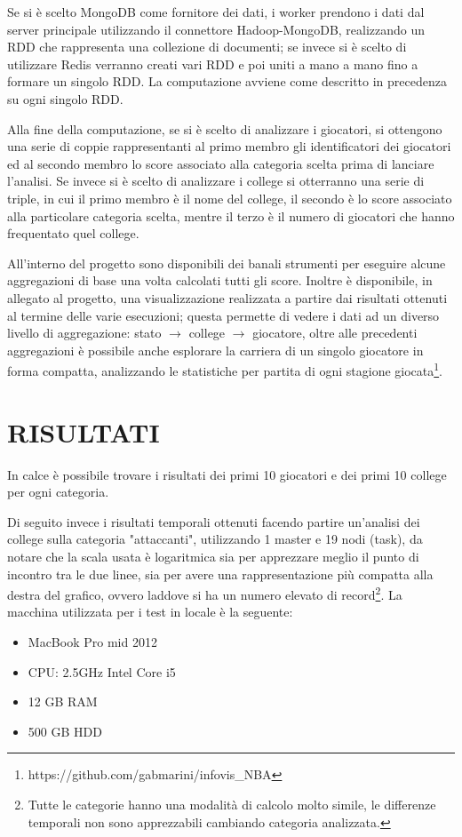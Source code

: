 \documentclass[10pt,a4paper,twocolumn]{article}
\begin{document}
Se si è scelto MongoDB come fornitore dei dati, i worker prendono i dati dal server principale utilizzando il connettore Hadoop-MongoDB, realizzando un RDD che rappresenta una collezione di documenti; se invece si è scelto di utilizzare Redis verranno creati vari RDD e poi uniti a mano a mano fino a formare un singolo RDD. La computazione avviene come descritto in precedenza su ogni singolo RDD.

Alla fine della computazione, se si è scelto di analizzare i giocatori, si ottengono una serie di coppie rappresentanti al primo membro gli identificatori dei giocatori ed al secondo membro lo score associato alla categoria scelta prima di lanciare l'analisi. Se invece si è scelto di analizzare i college si otterranno una serie di triple, in cui il primo membro è il nome del college, il secondo è lo score associato alla particolare categoria scelta, mentre il terzo è il numero di giocatori che hanno frequentato quel college.

All'interno del progetto sono disponibili dei banali strumenti per eseguire alcune aggregazioni di base una volta calcolati tutti gli score. Inoltre è disponibile, in allegato al progetto, una visualizzazione realizzata a partire dai risultati ottenuti al termine delle varie esecuzioni; questa permette di vedere i dati ad un diverso livello di aggregazione: stato $\rightarrow$ college $\rightarrow$ giocatore, oltre alle precedenti aggregazioni è possibile anche esplorare la carriera di un singolo giocatore in forma compatta, analizzando le statistiche per partita di ogni stagione giocata\footnote{https://github.com/gabmarini/infovis\_NBA}.

\section{RISULTATI}

In calce è possibile trovare i risultati dei primi 10 giocatori e dei primi 10 college per ogni categoria.

Di seguito invece i risultati temporali ottenuti facendo partire un'analisi dei college sulla categoria "attaccanti", utilizzando 1 master e 19 nodi (task), da notare che la scala usata è logaritmica sia per apprezzare meglio il punto di incontro tra le due linee, sia per avere una rappresentazione più compatta alla destra del grafico, ovvero laddove si ha un numero elevato di record\footnote{Tutte le categorie hanno una modalità di calcolo molto simile, le differenze temporali non sono apprezzabili cambiando categoria analizzata.}. La macchina utilizzata per i test in locale è la seguente:
\begin{itemize}
	\item MacBook Pro mid 2012
	\item CPU: 2.5GHz Intel Core i5
	\item 12 GB RAM
	\item 500 GB HDD
\end{itemize}
\end{document}
